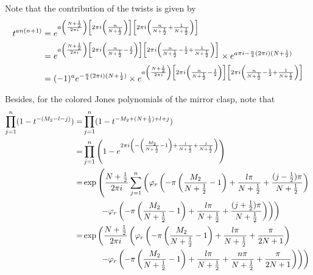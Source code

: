 \documentclass[10pt,a4paper]{article}
\newcommand{\lt}{\left}
\newcommand{\rt}{\right}
\begin{document}
Note that the contribution of the twists is given by
\begin{align}
t^{an(n+1)} 
&= e^{a \lt(\frac{N+\frac{1}{2}}{2\pi i}\rt) \lt[ 2\pi i \lt(\frac{n}{N+\frac{1}{2}} \rt) \rt] \lt[ 2\pi i \lt( \frac{n}{N+\frac{1}{2}} + \frac{1}{N+\frac{1}{2}} \rt) \rt] } \notag \\
&= e^{a \lt(\frac{N+\frac{1}{2}}{2\pi i}\rt) \lt[ 2\pi i \lt(\frac{n}{N+\frac{1}{2}} - \frac{1}{2} \rt) \rt] \lt[ 2\pi i \lt( \frac{n}{N+\frac{1}{2}} - \frac{1}{2} + \frac{1}{N+\frac{1}{2}} \rt) \rt] }
\times e^{a \pi i - \frac{a}{4}(2\pi i)(N+\frac{1}{2})} \notag \\
&= (-1)^a e^{ - \frac{a}{4}(2\pi i)(N+\frac{1}{2})}\times e^{a \lt(\frac{N+\frac{1}{2}}{2\pi i}\rt) \lt[ 2\pi i \lt(\frac{n}{N+\frac{1}{2}} - \frac{1}{2} \rt) \rt] \lt[ 2\pi i \lt( \frac{n}{N+\frac{1}{2}} - \frac{1}{2} + \frac{1}{N+\frac{1}{2}} \rt) \rt] }\label{t'3}
\end{align}

Besides, for the colored Jones polynomials of the mirror clasp, note that
\begin{align}
 \prod_{j=1}^{n} (1-t^{-(M_2-l-j)}) 
=&\prod_{j=1}^n (1-t^{- M_2 + (N+\frac{1}{2}) +l +j}) \notag\\
=&\prod_{j=1}^n \lt(1 - e^{2\pi i \lt(-\lt(\frac{M_2}{N+\frac{1}{2}} -1\rt) + \frac{l}{N+\frac{1}{2}} + \frac{j}{N+\frac{1}{2}}\rt)}\rt)\notag \\
=&\exp\lt(\frac{N+\frac{1}{2}}{2\pi i}\sum_{j=1}^n \lt( \varphi_r \lt(-\pi \lt(\frac{M_2}{N+\frac{1}{2}} -1\rt) + \frac{l\pi}{N+\frac{1}{2}} + \frac{(j-\frac{1}{2})\pi}{N+\frac{1}{2}}\rt) \rt. \rt.\notag\\
&\lt. \lt.\qquad - \varphi_r\lt(  -\pi\lt(\frac{M_2}{N+\frac{1}{2}} -1\rt) + \frac{l\pi}{N+\frac{1}{2}} + \frac{(j+\frac{1}{2})\pi}{N+\frac{1}{2}}\rt)  \rt) \rt) \notag\\
=& \exp \lt(\frac{N+\frac{1}{2}}{2\pi i} \lt( \varphi_r \lt( -\pi  \lt(\frac{M_2}{N+\frac{1}{2}} -1\rt) + \frac{l\pi}{N+\frac{1}{2}} + \frac{\pi}{2N+1}\rt) \rt.\rt.\notag\\
&\lt. \lt.\qquad - \varphi_r\lt( -\pi  \lt(\frac{M_2}{N+\frac{1}{2}} -1\rt) + \frac{l\pi}{N+\frac{1}{2}} + \frac{n\pi}{N+\frac{1}{2}} + \frac{\pi}{2N+1}\rt)  \rt)\rt)\label{t9}
\end{align}
\end{document}
